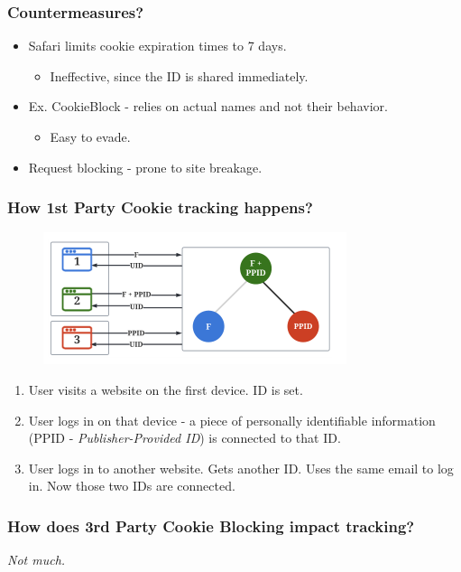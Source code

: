 \documentclass{beamer}
\begin{document}
\begin{frame}
\frametitle{Countermeasures?}

\begin{itemize}
\item Safari limits cookie expiration times to 7 days. 
	\begin{itemize}
	\item Ineffective, since the ID is shared immediately. 
	\end{itemize}
\item Ex. CookieBlock - relies on actual names and not their behavior.
	\begin{itemize}
	\item Easy to evade.
	\end{itemize}
\item Request blocking - prone to site breakage.
\end{itemize}

\end{frame}

\begin{frame}
\frametitle{How 1st Party Cookie tracking happens?}


\begin{figure}
\includegraphics[scale=0.5]{img/crosssite}
\end{figure}

\begin{enumerate}
\item User visits a website on the first device. ID is set.
\item User logs in on that device - a piece of personally identifiable information (PPID - \textit{Publisher-Provided ID}) is connected to that ID.
\item User logs in to another website. Gets another ID. Uses the same email to log in. Now those two IDs are connected.
\end{enumerate}

\end{frame}

\begin{frame}
\frametitle{How does 3rd Party Cookie Blocking impact tracking?}
\centering
\textit{Not much.}

\end{frame}
\end{document}
